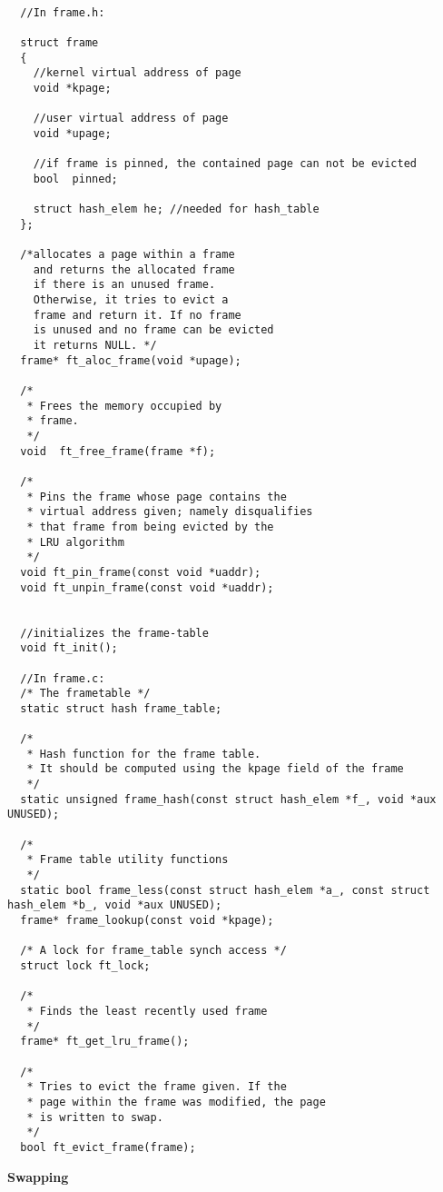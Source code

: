 \begin{lstlisting}

  //In frame.h:

  struct frame
  {
	//kernel virtual address of page
	void *kpage; 	
	  
	//user virtual address of page
	void *upage;	
	
	//if frame is pinned, the contained page can not be evicted
	bool  pinned;		
	
	struct hash_elem he; //needed for hash_table
  };

  /*allocates a page within a frame
    and returns the allocated frame
    if there is an unused frame.
    Otherwise, it tries to evict a 
    frame and return it. If no frame
    is unused and no frame can be evicted
    it returns NULL. */
  frame* ft_aloc_frame(void *upage);

  /*
   * Frees the memory occupied by
   * frame.
   */
  void 	ft_free_frame(frame *f);  

  /*
   * Pins the frame whose page contains the
   * virtual address given; namely disqualifies 
   * that frame from being evicted by the 
   * LRU algorithm
   */
  void ft_pin_frame(const void *uaddr);
  void ft_unpin_frame(const void *uaddr);


  //initializes the frame-table
  void ft_init();

  //In frame.c:
  /* The frametable */
  static struct hash frame_table;

  /* 
   * Hash function for the frame table.
   * It should be computed using the kpage field of the frame 
   */
  static unsigned frame_hash(const struct hash_elem *f_, void *aux UNUSED);
  
  /* 
   * Frame table utility functions
   */
  static bool frame_less(const struct hash_elem *a_, const struct hash_elem *b_, void *aux UNUSED);
  frame* frame_lookup(const void *kpage);

  /* A lock for frame_table synch access */
  struct lock ft_lock;

  /*
   * Finds the least recently used frame
   */
  frame* ft_get_lru_frame();
  
  /* 
   * Tries to evict the frame given. If the 
   * page within the frame was modified, the page
   * is written to swap. 
   */
  bool ft_evict_frame(frame);

\end{lstlisting}

\textbf{Swapping}

